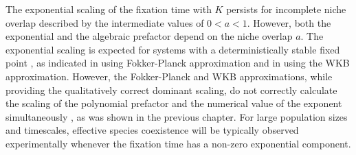 The exponential scaling of the fixation time with $K$ persists for incomplete niche overlap described by the intermediate values of $0<a<1$. 
However, both the exponential and the algebraic prefactor depend on the niche overlap $a$. 
The exponential scaling is expected for systems with a deterministically stable fixed point \cite{Ovaskainen2010,Assaf2016,Gabel2013,Fisher2014,Doering2005}, as indicated in \cite{Chotibut2015,Dobrinevski2012,Lin2012} using Fokker-Planck approximation and in \cite{Gabel2013} using the WKB approximation. 
However, the Fokker-Planck and WKB approximations, while providing the qualitatively correct dominant scaling, do not correctly calculate the scaling of the polynomial prefactor and the numerical value of the exponent simultaneously \cite{Kessler2007,Ovaskainen2010,Badali2019b}, as was shown in the previous chapter.
For large population sizes and timescales, effective species coexistence will be typically observed experimentally whenever the fixation time has a non-zero exponential component. %

\iffalse
\begin{figure}[ht]
	\centering
	\texttt{[image: \{functionalKa10]}}
	\caption{\emph{Right: Niche overlap controls the transition from coexistence to fixation.}  Blue line: $f(a)$ from the ansatz of equation (\ref{ansatz}) characterizes the exponential dependence of the fixation time on $K$; it  smoothly approaches zero as the niche overlap reaches its Moran line value $a=1$. Green line: $g(a)$ quantifies the scaling of the pre-exponential prefactor $K^{g(a)}$ with $K$. Yellow line: $h(a)$ is the multiplicative constant. Dashed bars represent a 95\% confidence interval. The dots at the extremes $a=0$ and $a=1$ are the expected asymptotic values. 
	} \label{ansatzplot}
\end{figure}%
\fi

